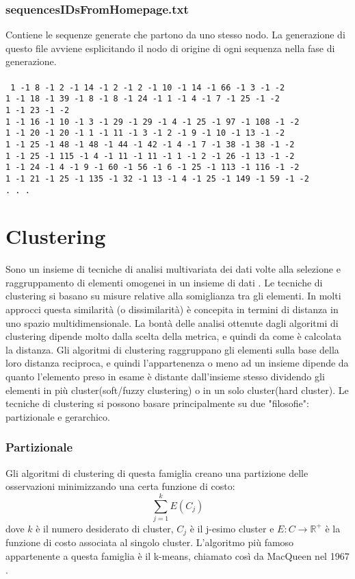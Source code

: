 \subsubsection{sequencesIDsFromHomepage.txt}
Contiene le sequenze generate che partono da uno stesso nodo. La generazione di questo file avviene esplicitando il nodo di origine di ogni sequenza nella fase di generazione.
\\\\
\texttt{
1 -1 8 -1 2 -1 14 -1 2 -1 2 -1 10 -1 14 -1 66 -1 3 -1 -2\\
1 -1 18 -1 39 -1 8 -1 8 -1 24 -1 1 -1 4 -1 7 -1 25 -1 -2\\
1 -1 23 -1 -2\\
1 -1 16 -1 10 -1 3 -1 29 -1 29 -1 4 -1 25 -1 97 -1 108 -1 -2\\
1 -1 20 -1 20 -1 1 -1 11 -1 3 -1 2 -1 9 -1 10 -1 13 -1 -2\\
1 -1 25 -1 48 -1 48 -1 44 -1 42 -1 4 -1 7 -1 38 -1 38 -1 -2\\
1 -1 25 -1 115 -1 4 -1 11 -1 11 -1 1 -1 2 -1 26 -1 13 -1 -2\\
1 -1 24 -1 4 -1 9 -1 60 -1 56 -1 6 -1 25 -1 113 -1 116 -1 -2\\
1 -1 21 -1 25 -1 135 -1 32 -1 13 -1 4 -1 25 -1 149 -1 59 -1 -2\\
. . .\\
}

\section{Clustering}
Sono un insieme di tecniche di analisi multivariata dei dati volte alla selezione e raggruppamento di elementi omogenei in un insieme di dati \cite{tryon}. Le tecniche di clustering si basano su misure relative alla somiglianza tra gli elementi. In molti approcci questa similarità (o dissimilarità) è concepita in termini di distanza in uno spazio multidimensionale. La bontà delle analisi ottenute dagli algoritmi di clustering dipende molto dalla scelta della metrica, e quindi da come è calcolata la distanza. Gli algoritmi di clustering raggruppano gli elementi sulla base della loro distanza reciproca, e quindi l'appartenenza o meno ad un insieme dipende da quanto l'elemento preso in esame è distante dall'insieme stesso dividendo gli elementi in più cluster(soft/fuzzy clustering) o in un solo cluster(hard cluster).
Le tecniche di clustering si possono basare principalmente su due "filosofie":
partizionale e gerarchico.

\subsubsection{Partizionale}
Gli algoritmi di clustering di questa famiglia creano una partizione delle osservazioni minimizzando una certa funzione di costo:
\begin{equation}
  \sum_{j=1}^{k} E\left ( C_j \right )
\end{equation}
dove $ k$ è il numero desiderato di cluster, $ C_j$ è il j-esimo cluster e $ E : C \to \mathbb{R^+}$ è la funzione di costo associata al singolo cluster. L'algoritmo più famoso appartenente a questa famiglia è il k-means, chiamato così da MacQueen nel 1967 \cite{MacQueen67}.


